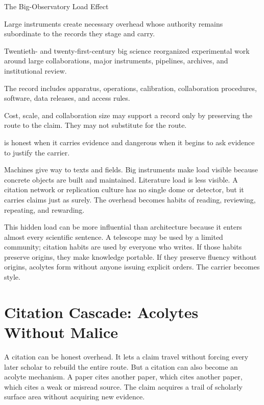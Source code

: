 \begin{phenom}{The Big-Observatory Load Effect~\cite{galison1997}}
\label{ph:big-observatory-load}

\PhStatement
Large instruments create necessary overhead whose authority remains
subordinate to the records they stage and carry.

\PhOrigin
Twentieth- and twenty-first-century big science reorganized experimental work
around large collaborations, major instruments, pipelines, archives, and
institutional review.

\PhObservation
The record includes apparatus, operations, calibration, collaboration
procedures, software, data releases, and access rules.

\PhConstraint
Cost, scale, and collaboration size may support a record only by preserving
the route to the claim. They may not substitute for the route.

\PhConsequence
{} is honest when it carries evidence and dangerous when it begins to
ask evidence to justify the carrier.
\end{phenom}

Machines give way to texts and fields. Big instruments make load visible
because concrete objects are built and maintained. Literature load is less
visible. A citation network or replication culture has no single dome or
detector, but it carries claims just as surely. The overhead becomes habits
of reading, reviewing, repeating, and rewarding.

This hidden load can be more influential than architecture because it enters
almost every scientific sentence. A telescope may be used by a limited
community; citation habits are used by everyone who writes. If those habits
preserve origins, they make knowledge portable. If they preserve fluency
without origins, acolytes form without anyone issuing explicit orders. The
carrier becomes style.

\section{Citation Cascade: Acolytes Without Malice}

A citation can be honest overhead. It lets a claim travel without forcing
every later scholar to rebuild the entire route. But a citation can also
become an acolyte mechanism. A paper cites another paper, which cites another paper,
which cites a weak or misread source. The claim acquires a trail of scholarly
surface area without acquiring new evidence.

